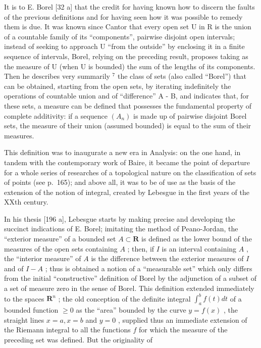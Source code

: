 It is to E. Borel {[}32 a{]} that the credit for having known how to discern the faults of the previous definitions and for having seen how it was possible to remedy them is due. It was known since Cantor that every open set U in R is the union of a countable family of its ``components'', pairwise disjoint open intervals; instead of seeking to approach U ``from the outside'' by enclosing it in a finite sequence of intervals, Borel, relying on the preceding result, proposes taking as the measure of U (when U is bounded) the sum of the lengths of its components. Then he describes very summarily \(^{7}\) the class of sets (also called ``Borel'') that can be obtained, starting from the open sets, by iterating indefinitely the operations of countable union and of ``difference'' A - B, and indicates that, for these sets, a measure can be defined that possesses the fundamental property of complete additivity: if a sequence \((A_{n})\) is made up of pairwise disjoint Borel sets, the measure of their union (assumed bounded) is equal to the sum of their measures.

This definition was to inaugurate a new era in Analysis: on the one hand, in tandem with the contemporary work of Baire, it became the point of departure for a whole series of researches of a topological nature on the classification of sets of points (see p.~165); and above all, it was to be of use as the basis of the extension of the notion of integral, created by Lebesgue in the first years of the XXth century.

In his thesis {[}196 a{]}, Lebesgue starts by making precise and developing the succinct indications of E. Borel; imitating the method of Peano-Jordan, the ``exterior measure'' of a bounded set \(A \subset \mathbf{R}\) is defined as the lower bound of the measures of the open sets containing \(A\) ; then, if \(I\) is an interval containing \(A\) , the ``interior measure'' of \(A\) is the difference between the exterior measures of \(I\) and of \(I - A\) ; thus is obtained a notion of a ``measurable set'' which only differs from the initial ``constructive'' definition of Borel by the adjunction of a subset of a set of measure zero in the sense of Borel. This definition extended immediately to the spaces \(\mathbf{R}^n\) ; the old conception of the definite integral \(\int_{a}^{b} f(t) dt\) of a bounded function \(\geq 0\) as the ``area'' bounded by the curve \(y = f(x)\) , the straight lines \(x = a, x = b\) and \(y = 0\) , supplied thus an immediate extension of the Riemann integral to all the functions \(f\) for which the measure of the preceding set was defined. But the originality of

